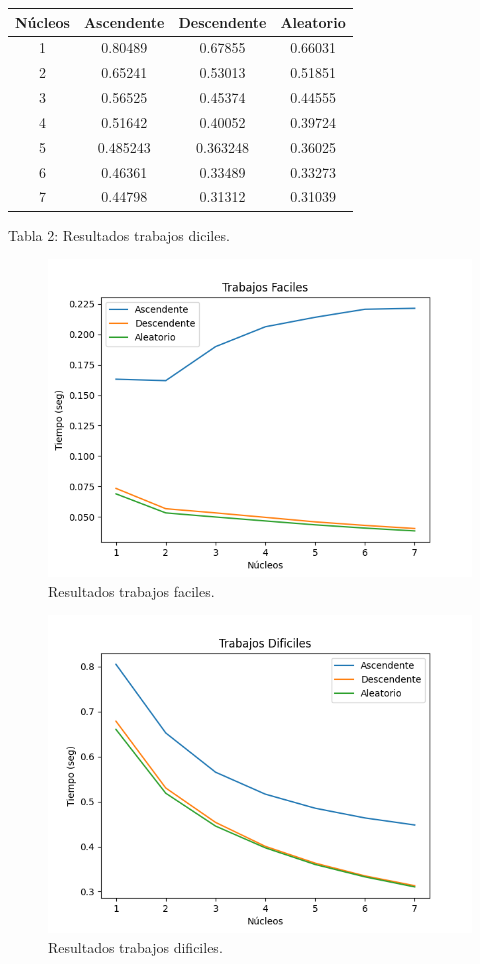 \documentclass{article}
\begin{document}
\begin{center}
\begin{tabular}{|c|c|c|c|}
	\hline
	Núcleos & Ascendente & Descendente & Aleatorio \\
	\hline
	1 & 0.80489 & 0.67855 & 0.66031 \\
	\hline
	2 & 0.65241 & 0.53013 & 0.51851 \\
	\hline
	3 & 0.56525 & 0.45374 & 0.44555 \\
	\hline
	4 & 0.51642 & 0.40052 & 0.39724 \\
	\hline
	5 & 0.485243 & 0.363248 & 0.36025 \\
	\hline
	6 & 0.46361 & 0.33489 & 0.33273 \\
	\hline
	7 & 0.44798 & 0.31312 & 0.31039 \\
	\hline
\end{tabular}
\end{center}
\begin{center}
	Tabla 2: Resultados trabajos diciles.
\end{center}

\begin{figure}
	\centering
	\includegraphics[width=0.7\linewidth]{Figure_1}
	\caption{Resultados trabajos faciles.}
	\label{fig:figure1}
\end{figure}


\begin{figure}
	\centering
	\includegraphics[width=0.7\linewidth]{Figure_2}
	\caption{Resultados trabajos dificiles.}
	\label{fig:figure2}
\end{figure}
\end{document}
